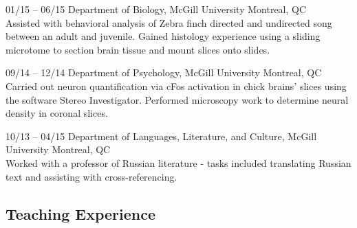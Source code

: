 \documentclass[]{friggeri-cv} %
\begin{document}
\begin{entrylist}


\entry
{01/15 -- 06/15}
{Department of Biology, McGill University}
{Montreal, QC}
{\\
Assisted with behavioral analysis of Zebra finch directed and undirected song
between an adult and juvenile. Gained histology experience using a sliding microtome
to section brain tissue and mount slices onto slides.}

\entry
{09/14 -- 12/14}
{Department of Psychology, McGill University}
{Montreal, QC}
{\\
Carried out neuron quantification via cFos activation
in chick brains' slices using the software Stereo Investigator.
Performed microscopy work to determine neural density in 
coronal slices.
}


\entry
{10/13 -- 04/15}
{Department of Languages, Literature, and Culture, McGill University}
{Montreal, QC}
{\\
Worked with a professor of Russian literature - tasks included translating Russian text and 
assisting with cross-referencing. 
}
\end{entrylist}

\subsection{Teaching Experience}
\end{document}

